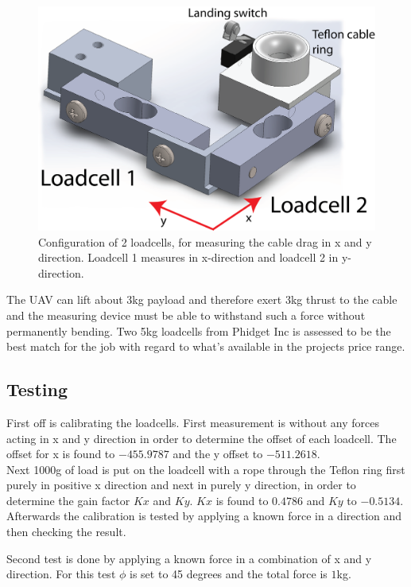 \begin{figure}[H]
\centering
\includegraphics[scale=0.75]{graphics/cad/loadcell.png}
\caption{Configuration of 2 loadcells, for measuring the cable drag in x and y direction. Loadcell 1 measures in x-direction and loadcell 2 in y-direction.}
\label{fig:loadcells}
\end{figure}

\noindent
The UAV can lift about 3kg payload and therefore exert 3kg thrust to the cable and the measuring device must be able to withstand such a force without permanently bending. Two 5kg loadcells from Phidget Inc is assessed to be the best match for the job with regard to what's available in the projects price range.

\subsection{Testing}
First off is calibrating the loadcells. First measurement is without any forces acting in x and y direction in order to determine the offset of each loadcell.
The offset for x is found to $-455.9787$ and the y offset to $-511.2618$.\\
Next 1000g of load is put on the loadcell with a rope through the Teflon ring first purely in positive x direction and next in purely y direction, in order to determine the gain factor $Kx$ and $Ky$. $Kx$ is found to $0.4786$ and $Ky$ to $-0.5134$. Afterwards the calibration is tested by applying a known force in a direction and then checking the result.


Second test is done by applying a known force in a combination of x and y direction. For this test $\phi$ is set to 45 degrees and the total force is $1$kg.

